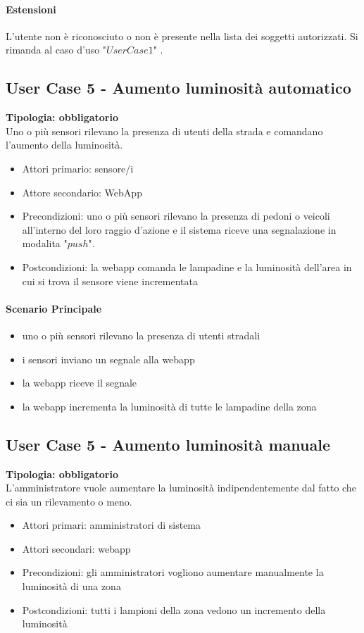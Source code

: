 \documentclass[12pt]{article}
\begin{document}
\paragraph{Estensioni} L'utente non è riconosciuto o non è presente nella lista dei soggetti autorizzati. Si rimanda al caso d'uso "$User Case 1$" .

\subsection{User Case 5 - Aumento luminosità automatico}
\textbf{Tipologia: obbligatorio}\\
Uno o più sensori rilevano la presenza di utenti della strada e comandano l'aumento della luminosità.
\begin{itemize}
	\item Attori primario: sensore/i
	\item Attore secondario: WebApp
	\item Precondizioni: uno o più sensori rilevano la presenza di pedoni o veicoli all'interno del loro raggio d'azione e il sistema riceve una segnalazione in modalita "$push$".
	\item Postcondizioni: la webapp comanda le lampadine e la luminosità dell'area in cui si trova il sensore viene incrementata
\end{itemize}
\paragraph{Scenario Principale}
\begin{itemize}
	\item uno o più sensori rilevano la presenza di utenti stradali
	\item i sensori inviano un segnale alla webapp
	\item la webapp riceve il segnale
	\item la webapp incrementa la luminosità di tutte le lampadine della zona
\end{itemize}

\subsection{User Case 5 - Aumento luminosità manuale}
\textbf{Tipologia: obbligatorio} \\
L'amministratore vuole aumentare la luminosità indipendentemente dal fatto che ci sia un rilevamento o meno.
\begin{itemize}
	\item Attori primari: amministratori di sistema
	\item Attori secondari: webapp
	\item Precondizioni: gli amministratori vogliono aumentare manualmente la luminosità di una zona
	\item Postcondizioni: tutti i lampioni della zona vedono un incremento della luminosità
\end{itemize}
\end{document}
